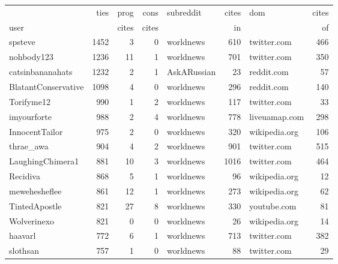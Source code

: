 \begin{tabular}{lrrrlrlr}
\toprule
{} & ties & prog & cons & subreddit & cites & dom & cites \\
user &    & cites & cites &         & in    &     & of    \\
\midrule
spsteve             &  1452 &           3 &           0 &    worldnews &       610 &      twitter.com &       466 \\
nohbody123          &  1236 &          11 &           1 &    worldnews &       701 &      twitter.com &       350 \\
catsinbananahats    &  1232 &           2 &           1 &  AskARussian &        23 &       reddit.com &        57 \\
BlatantConservative &  1098 &           4 &           0 &    worldnews &       296 &       reddit.com &       140 \\
Torifyme12          &   990 &           1 &           2 &    worldnews &       117 &      twitter.com &        33 \\
imyourforte         &   988 &           2 &           4 &    worldnews &       778 &    liveuamap.com &       298 \\
InnocentTailor      &   975 &           2 &           0 &    worldnews &       320 &    wikipedia.org &       106 \\
thrae\_awa           &   904 &           4 &           2 &    worldnews &       901 &      twitter.com &       515 \\
LaughingChimera1    &   881 &          10 &           3 &    worldnews &      1016 &      twitter.com &       464 \\
Recidiva            &   868 &           5 &           1 &    worldnews &        96 &    wikipedia.org &        12 \\
mewehesheflee       &   861 &          12 &           1 &    worldnews &       273 &    wikipedia.org &        62 \\
TintedApostle       &   821 &          27 &           8 &    worldnews &       330 &      youtube.com &        81 \\
Wolverinexo         &   821 &           0 &           0 &    worldnews &        26 &    wikipedia.org &        14 \\
haavarl             &   772 &           6 &           1 &    worldnews &       713 &      twitter.com &       382 \\
slothsan            &   757 &           1 &           0 &    worldnews &        88 &      twitter.com &        29 \\

\end{tabular}
